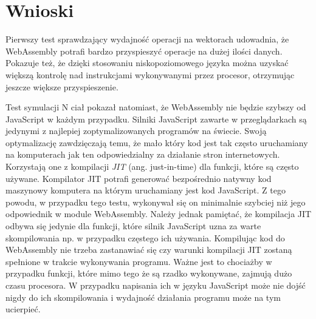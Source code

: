 \documentclass[language=polish,type=master]{aghmodern}
\begin{document}
\section{Wnioski}
Pierwszy test sprawdzający wydajność operacji na wektorach udowadnia, że WebAssembly potrafi bardzo przyspieszyć operacje na dużej ilości danych.
Pokazuje też, że dzięki stosowaniu niskopoziomowego języka można uzyskać większą kontrolę nad instrukcjami wykonywanymi przez procesor, otrzymując jeszcze większe przyspieszenie.

Test symulacji N ciał pokazał natomiast, że WebAssembly nie będzie szybszy od JavaScript w każdym przypadku.
Silniki JavaScript zawarte w przeglądarkach są jedynymi z najlepiej zoptymalizowanych programów na świecie.
Swoją optymalizację zawdzięczają temu, że mało który kod jest tak często uruchamiany na komputerach jak ten odpowiedzialny za działanie stron internetowych.
Korzystają one z kompilacji \emph{JIT}\footnotemark{} (ang. just-in-time) dla funkcji, które są często używane.
Kompilator JIT potrafi generować bezpośrednio natywny kod maszynowy komputera na którym uruchamiany jest kod JavaScript.
Z tego powodu, w przypadku tego testu, wykonywał się on minimalnie szybciej niż jego odpowiednik w module WebAssembly.
Należy jednak pamiętać, że kompilacja JIT odbywa się jedynie dla funkcji, które silnik JavaScript uzna za warte skompilowania np. w przypadku częstego ich używania.
Kompilując kod do WebAssembly nie trzeba zastanawiać się czy warunki kompilacji JIT zostaną spełnione w trakcie wykonywania programu.
Ważne jest to chociażby w przypadku funkcji, które mimo tego że są rzadko wykonywane, zajmują dużo czasu procesora.
W przypadku napisania ich w języku JavaScript może nie dojść nigdy do ich skompilowania i wydajność działania programu może na tym ucierpieć.
\end{document}
